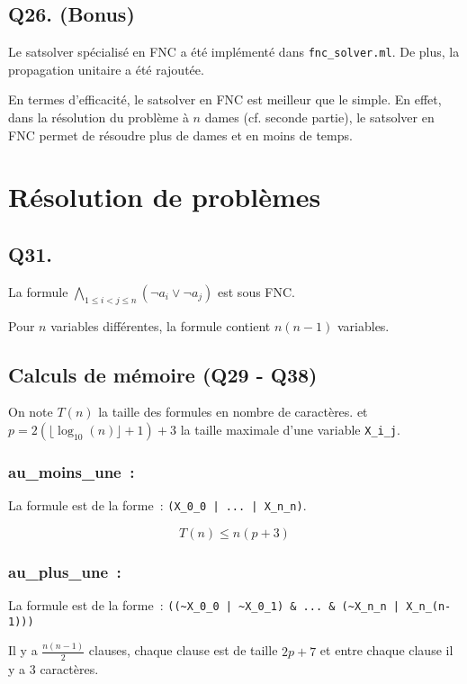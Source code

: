 \subsection*{Q26. (Bonus)}
Le satsolver spécialisé en FNC a été implémenté dans \verb|fnc_solver.ml|.
De plus, la propagation unitaire a été rajoutée.

En termes d'efficacité, le satsolver en FNC est meilleur que le simple.
En effet, dans la résolution du problème à $n$ dames (cf. seconde partie),
le satsolver en FNC permet de résoudre plus de dames et en moins de temps.

\section{Résolution de problèmes}
\subsection*{Q31.}
La formule
$\boxed{\bigwedge\limits_{1 \leq i < j \leq n}\left(\lnot a_i \lor \lnot a_j\right)}$
est sous FNC.

Pour $n$ variables différentes, la formule contient $n(n-1)$ variables.

\subsection*{Calculs de mémoire (Q29 - Q38)}

On note $T(n)$ la taille des formules en nombre de caractères.
et $p = 2(\lfloor \log_{10}(n)\rfloor + 1) + 3$ la taille maximale d'une
variable \verb|X_i_j|.

\subsubsection*{au\_moins\_une~:}
La formule est de la forme~: \verb$(X_0_0 | ... | X_n_n)$.

\begin{equation*}
    T(n) \le n(p+3)
\end{equation*}

\subsubsection*{au\_plus\_une~:}
La formule est de la forme~: \verb$((~X_0_0 | ~X_0_1) & ... & (~X_n_n | X_n_(n-1)))$

Il y a $\frac{n(n-1)}{2}$ clauses, chaque clause est de taille $2p + 7$ et entre
chaque clause il y a $3$ caractères.

